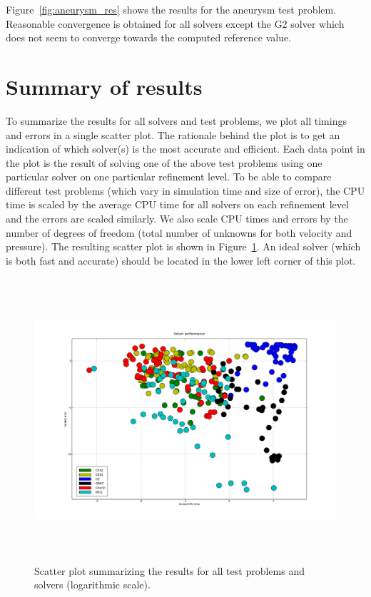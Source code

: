 Figure~\ref{fig:aneurysm_res} shows the results for the aneurysm test
problem. Reasonable convergence is obtained for all solvers except the
G2 solver which does not seem to converge towards the computed
reference value.

\section{Summary of results}

To summarize the results for all solvers and test problems, we plot
all timings and errors in a single scatter plot. The rationale behind
the plot is to get an indication of which solver(s) is the most
accurate and efficient. Each data point in the plot is the result of
solving one of the above test problems using one particular solver on
one particular refinement level. To be able to compare different test
problems (which vary in simulation time and size of error), the CPU
time is scaled by the average CPU time for all solvers on each
refinement level and the errors are scaled similarly. We also scale
CPU times and errors by the number of degrees of freedom (total number
of unknowns for both velocity and pressure). The resulting scatter
plot is shown in Figure~\ref{fig:scatter}. An ideal solver (which is
both fast and accurate) should be located in the lower left corner of
this plot.

\begin{figure}
  \includegraphics[width=20cm,height=10.5cm,keepaspectratio=false]{chapters/kvs-1/pdf/new_scatter.pdf}
  \caption{Scatter plot summarizing the results for all test problems
    and solvers (logarithmic scale).}
  \label{fig:scatter}
\end{figure}

